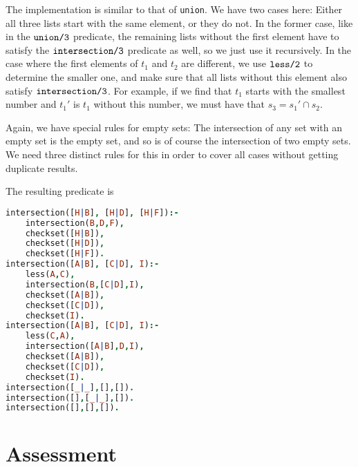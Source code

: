 \documentclass[a4paper]{article}
\newcommand{\pfuncn}[2]{\textnormal{\texttt{#1/#2}}\xspace}
\begin{document}
\begin{description}
The implementation is similar to that of \texttt{union}. We have two cases here: Either all three lists start with the same element, or they do not. In the former case, like in the $\pfuncn{union}{3}$ predicate, the remaining lists without the first element have to satisfy the $\pfuncn{intersection}{3}$ predicate as well, so we just use it recursively. In the case where the first elements of $t_1$ and $t_2$ are different, we use $\pfuncn{less}{2}$ to determine the smaller one, and make sure that all lists without this element also satisfy $\pfuncn{intersection}{3}$. For example, if we find that $t_1$ starts with the smallest number and $t_1'$ is $t_1$ without this number, we must have that $s_3 = s_1' \cap s_2$. 

Again, we have special rules for empty sets: The intersection of any set with an empty set is the empty set, and so is of course the intersection of two empty sets. We need three distinct rules for this in order to cover all cases without getting duplicate results. 

The resulting predicate is 
\begin{lstlisting}[language=prolog]
intersection([H|B], [H|D], [H|F]):-
	intersection(B,D,F),
	checkset([H|B]),
	checkset([H|D]),
	checkset([H|F]).
intersection([A|B], [C|D], I):-
	less(A,C),
	intersection(B,[C|D],I),
	checkset([A|B]),
	checkset([C|D]),
	checkset(I).
intersection([A|B], [C|D], I):-
	less(C,A),
	intersection([A|B],D,I),
	checkset([A|B]),
	checkset([C|D]),
	checkset(I).
intersection([_|_],[],[]).
intersection([],[_|_],[]).
intersection([],[],[]).
\end{lstlisting}
\end{description}

\section*{Assessment}
\end{document}

